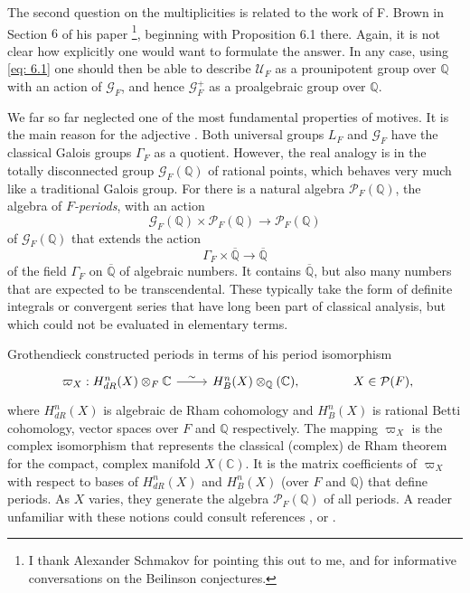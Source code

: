 \documentclass[preprint,12pt, leqno]{elsarticle}
\newcommand{\UGal}{\mathcal{G}_F}
\newcommand{\mQ}{\mathbb{Q}}
\newcommand{\mC}{\mathbb{C}}
\newcommand{\cP}{\mathcal{P}}
\newcommand{\cU}{\mathcal{U}}
\newcommand{\ubf}[1]{\textit{#1}}
\newcommand{\SP}{\mkern70mu }
\numberwithin{equation}{section}
\theoremstyle{named}
\begin{document}
The second question on the multiplicities is related to the work of F. Brown in Section $6$ of his paper \cite{B2c}\footnote{I thank Alexander Schmakov for pointing this out to me, and for informative conversations on the Beilinson conjectures.}, beginning with Proposition 6.1 there. Again, it is not clear how explicitly one would want to formulate the answer. In any case, using \eqref{eq: 6.1} one should then be able to describe $\cU_F$ as a prounipotent group over $\mQ$ with an action of $\UGal$, and hence $\UGal^+$ as a proalgebraic group over $\mQ$.

We far so far neglected one of the most fundamental properties of motives. It is the main reason for the adjective . Both universal groups $L_F$ and $\UGal$ have the classical Galois groups $\Gamma_F$ as a quotient. However, the real analogy is in the totally disconnected group $\UGal(\mQ)$ of rational points, which behaves very much like a traditional Galois group. For there is a natural algebra $\cP_F(\mQ)$, the algebra of \ubf{$F$-periods}, with an action
\begin{equation*}
    \UGal(\mQ)\times \cP_F(\mQ) \longrightarrow \cP_F(\mQ)
\end{equation*}
of $\UGal(\mQ)$ that extends the action
\begin{equation*}
    \Gamma_F\times \overline{\mQ} \longrightarrow  \overline{\mQ}
\end{equation*}
of the field $\Gamma_F$ on $\overline{\mQ}$ of algebraic numbers. It contains $\overline{\mQ}$, but also many numbers that are expected to be transcendental. These typically take the form of definite integrals or convergent series that have long been part of classical analysis, but which could not be evaluated in elementary terms.

Grothendieck constructed periods in terms of his period isomorphism
\begin{equation}\label{eq: 6.2}
\begin{tikzcd}
    \varpi_X: H_{dR}^n(X)\otimes_F\mC \ar[r, "\sim"] & H_B^n(X)\otimes_{\mQ}(\mC),
\end{tikzcd}
\SP X\in \cP(F),
\end{equation}
where $H_{dR}^n(X)$ is algebraic de Rham cohomology and $H_B^n(X)$ is rational Betti cohomology, vector spaces over $F$ and $\mQ$ respectively. The mapping $\varpi_X$ is the complex isomorphism that represents the classical (complex) de Rham theorem for the compact, complex manifold $X(\mC)$. It is the matrix coefficients of $\varpi_X$ with respect to bases of $H_{dR}^n(X)$ and $H_B^n(X)$ (over $F$ and $\mQ$) that define periods. As $X$ varies, they generate the algebra $\cP_F(\mQ)$ of all periods. A reader unfamiliar with these notions could consult references \cite{H}, \cite[Section 7]{Andre1} or \cite[Section 7]{N2}.
\end{document}
